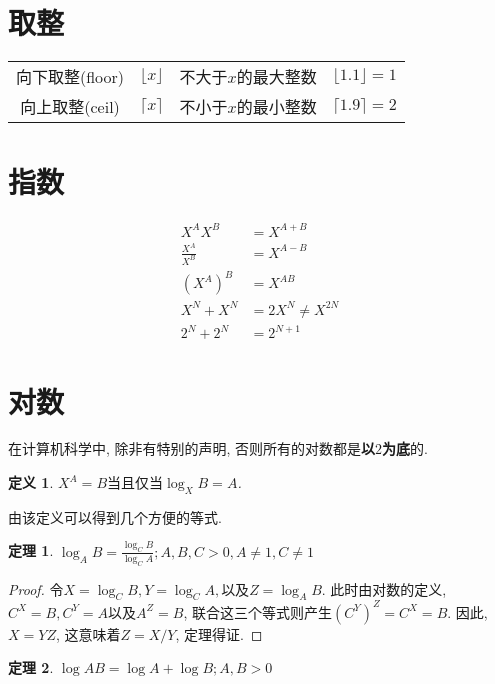 \documentclass[oneside,10pt,fontset=none]{ctexbook}
\newtheorem{definition}{定义}
\numberwithin{definition}{chapter}
\newtheorem{theorem}{定理}
\numberwithin{theorem}{chapter}
\newtheorem{proof}{证明}
\numberwithin{proof}{chapter}
\begin{document}
\section{取整}

\begin{tabular}{cccc}
    向下取整(floor) & $\lfloor x \rfloor$ & 不大于$x$的最大整数 & $\lfloor 1.1 \rfloor = 1$ \\
    向上取整(ceil)  & $\lceil x \rceil$   & 不小于$x$的最小整数 & $\lceil 1.9 \rceil = 2$
\end{tabular}

\section{指数}

\begin{equation*}
    \begin{split}
        X^AX^B &= X^{A+B} \\
        \frac{X^A}{X^B} &= X^{A-B} \\
        (X^A)^B &= X^{AB} \\
        X^N+X^N &= 2X^N \ne X^{2N} \\
        2^N+2^N &= 2^{N+1}
    \end{split}
\end{equation*}

\section{对数}

在计算机科学中, 除非有特别的声明, 否则所有的对数都是\textbf{以$2$为底}的.

\begin{definition}
    $X^A=B\text{当且仅当}\log_XB=A$.
\end{definition}

由该定义可以得到几个方便的等式.

\begin{theorem}
    $\log_AB = \frac{\log_CB}{\log_CA}; A,B,C > 0, A\ne 1, C\ne 1$
\end{theorem}

\begin{proof}
    令$X=\log_C{B},Y=\log_C{A},\text{以及}Z=\log_AB$. 此时由对数的定义, $C^X=B,C^Y=A\text{以及}A^Z=B$, 联合这三个等式则产生$(C^Y)^Z=C^X=B$. 因此, $X=YZ$, 这意味着$Z=X/Y$, 定理得证.
\end{proof}

\begin{theorem}
    $\log{AB} = \log{A} + \log{B}; A,B > 0$
\end{theorem}
\end{document}
